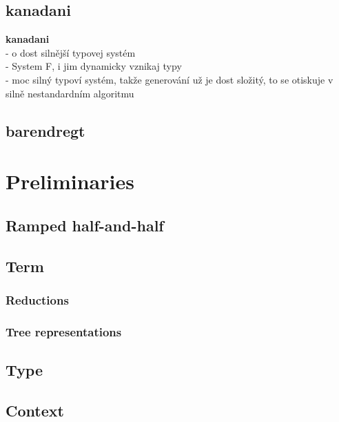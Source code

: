 \documentclass{llncs}
\begin{document}
\subsection{kanadani}

\textbf{kanadani}\\ 
- o dost silnější typovej systém\\
- System F, i jim dynamicky vznikaj typy\\
- moc silný typoví systém, takže generování už je dost
  složitý, to se otiskuje v silně nestandardním algoritmu


\subsection{barendregt}






\section{Preliminaries}

\subsection{Ramped half-and-half}

\subsection{Term}

\subsubsection{Reductions}
\subsubsection{Tree representations}


\subsection{Type}

\subsection{Context}
\end{document}
